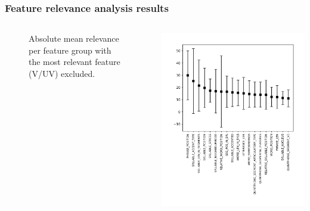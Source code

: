 \documentclass[a4paper,9pt]{beamer}
\theoremstyle{mytheoremstyle}
\begin{document}
\begin{frame}
\frametitle{Feature relevance analysis results}
\begin{columns}
\begin{figure}
	\caption{Absolute mean relevance per feature group with the most relevant feature (V/UV) excluded.}
\end{figure}
\begin{center}
  \includegraphics[width=\textwidth]{res/feature_relevance_ranking_-_mean_(absolute_sum)_-_general_feature_categories_-_no_vuv}
\end{center}
\end{columns}
\end{frame}
\end{document}
